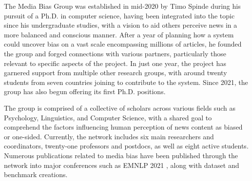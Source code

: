 The Media Bias Group \cite{media-bias-group} was established in mid-2020 by Timo Spinde during his pursuit of a Ph.D. in computer science, having been integrated into the topic since his undergraduate studies, with a vision to aid others perceive news in a more balanced and conscious manner. After a year of planning how a system could uncover bias on a vast scale encompassing millions of articles, he founded the group and forged connections with various partners, particularly those relevant to specific aspects of the project. In just one year, the project has garnered support from multiple other research groups, with around twenty students from seven countries joining to contribute to the system. Since 2021, the group has also begun offering its first Ph.D. positions.

The group is comprised of a collective of scholars across various fields such as Psychology, Linguistics, and Computer Science, with a shared goal to comprehend the factors influencing human perception of news content as biased or one-sided. Currently, the network includes six main researchers and coordinators, twenty-one professors and postdocs, as well as eight active students. Numerous publications related to media bias have been published through the network into major conferences such as EMNLP 2021 \cite{spinde-2021-babe}, along with dataset and benchmark creations.



